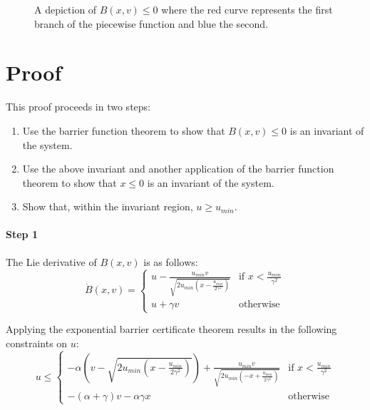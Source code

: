 \documentclass[12pt]{article}
\newcommand{\umin}{u_{min}}
\newcommand{\p}{\gamma}
\newcommand{\q}{\alpha}
\begin{document}
\begin{figure}[H]
\centering
{}
\caption{A depiction of $B(x,v) \leq 0$ where the red curve represents the first branch of the piecewise function and blue the second.}
\label{fig:sqrt-lin}
\end{figure}

\section{Proof}
This proof proceeds in two steps:
\begin{enumerate}
\item Use the barrier function theorem to show that $B(x,v) \leq 0$ is an invariant of the system.
\item Use the above invariant and another application of the barrier function theorem to show that $x \leq 0$ is an invariant of the system.
\item Show that, within the invariant region, $u \geq \umin$.
\end{enumerate}

\paragraph*{Step 1}
The Lie derivative of $B(x,v)$ is as follows:
\[\dot{B}(x,v) =
\begin{cases}
u - \frac{\umin v}{\sqrt{2\umin(x - \frac{\umin}{2\p^2})}} & \text{if } x < \frac{\umin}{\p^2}\\
u + \p v & \text{otherwise}
\end{cases}
\]

Applying the exponential barrier certificate theorem results in the following constraints on $u$:
\[
u \leq
\begin{cases}
-\q\left(v - \sqrt{2\umin(x - \frac{\umin}{2\p^2})}\right) + \frac{\umin v}{\sqrt{2\umin(-x + \frac{\umin}{2\p^2})}} & \text{if } x < \frac{\umin}{\p^2}\\
-(\q + \p) v -\q\p x & \text{otherwise}
\end{cases}
\]
\end{document}
